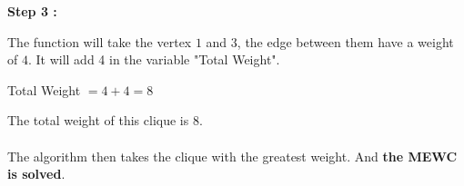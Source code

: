 \hspace*{1cm}  \textbf{Step 3 :}
\\
\begin{minipage}{0.4\textwidth}
\end{minipage}
\begin{minipage}{0.6\textwidth}
    The function will take the vertex $1$ and $3$, the edge between them have a weight of $4$. It will add 4 in the variable "Total Weight".
\end{minipage}
\begin{center}
    Total Weight $= 4 + 4 = 8$
\end{center}

The total weight of this clique is 8.
\\ \\
The algorithm then takes the clique with the greatest weight. And \textbf{the MEWC is solved}.
